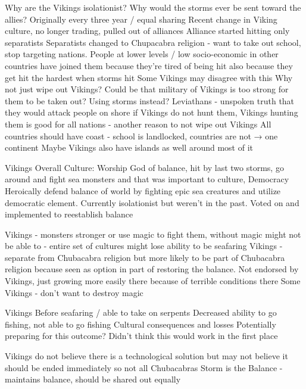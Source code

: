 \documentclass[blue]{GL2020}
\begin{document}
Why are the Vikings isolationist?  Why would the storms ever be sent toward the allies?
Originally every three year / equal sharing
Recent change in Viking culture, no longer trading, pulled out of alliances
Alliance started hitting only separatists
Separatists changed to Chupacabra religion - want to take out school, stop targeting nations.  People at lower levels / low socio-economic in other countries have joined them because they’re tired of being hit also because they get hit the hardest when storms hit
Some Vikings may disagree with this
Why not just wipe out Vikings?
Could be that military of Vikings is too strong for them to be taken out?  Using storms instead?
Leviathans - unspoken truth that they would attack people on shore if Vikings do not hunt them, Vikings hunting them is good for all nations - another reason to not wipe out Vikings
All countries should have coast - school is landlocked, countries are not → one continent
Maybe Vikings also have islands as well around most of it


Vikings
Overall Culture:
Worship God of balance, hit by last two storms, go around and fight sea monsters and that was important to culture, Democracy
Heroically defend balance of world by fighting epic sea creatures and utilize democratic element.  
Currently isolationist but weren’t in the past.  Voted on and implemented to reestablish balance

Vikings - monsters stronger or use magic to fight them, without magic might not be able to - entire set of cultures might lose ability to be seafaring
Vikings - separate from Chubacabra religion but more likely to be part of Chubacabra religion because seen as option in part of restoring the balance.  Not endorsed by Vikings, just growing more easily there because of terrible conditions there
Some Vikings - don’t want to destroy magic


Vikings
Before seafaring / able to take on serpents
Decreased ability to go fishing, not able to go fishing
Cultural consequences and losses
Potentially preparing for this outcome?  Didn’t think this would work in the first place

Vikings do not believe there is a technological solution but may not believe it should be ended immediately so not all Chubacabras
Storm is the Balance - maintains balance, should be shared out equally
\end{document}
